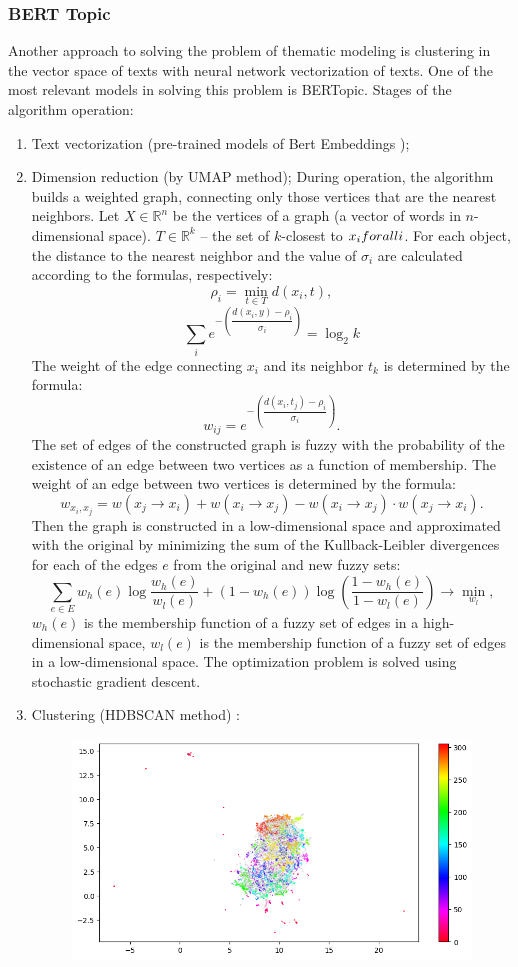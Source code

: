\documentclass[12pt]{report}
\begin{document}
\subsubsection{BERT Topic}
Another approach to solving the problem of thematic modeling is clustering in the vector space of texts with neural network vectorization of texts. One of the most relevant models in solving this problem is BERTopic. Stages of the algorithm operation:
\begin{enumerate}
\item Text vectorization (pre-trained models of Bert Embeddings );
\item Dimension reduction (by UMAP method);
During operation, the algorithm builds a weighted graph, connecting only those vertices that are the nearest neighbors. Let $X\in\mathbb{R}^n$ be the vertices of a graph (a vector of words in $n$-dimensional space). $T\in\mathbb{R}^{k}$ -- the set of $k$-closest to $x_i\\forall i$. For each object, the distance to the nearest neighbor and the value of $\sigma_i$ are calculated according to the formulas, respectively:
\[\rho_i = \min\limits_{t\in T} d(x_i, t),\]
\[\sum\limits_{i}e^{-\left(\dfrac{d(x_i,y) - \rho_i}{\sigma_i}\right)} = \log_2 k\]
The weight of the edge connecting $x_i$ and its neighbor $t_k$ is determined by the formula:
\[w_{ij} = e^{-\left(\dfrac{d(x_i, t_j) -\rho_i}{\sigma_i}\right)}.\]
The set of edges of the constructed graph is fuzzy with the probability of the existence of an edge between two vertices as a function of membership. The weight of an edge between two vertices is determined by the formula:
\[w_{x_i, x_j} = w(x_j \to x_i) + w(x_i \to x_j) - w(x_i \to x_j) \cdot w(x_j\to x_i).\]
Then the graph is constructed in a low-dimensional space and approximated with the original by minimizing the sum of the Kullback-Leibler divergences for each of the edges $e$ from the original and new fuzzy sets:
\[\sum\limits_{e\in E} w_h(e)\log\dfrac{w_h(e)}{w_l(e)} + (1-w_h(e))\log\left(\dfrac{1-w_h(e)}{1-w_l(e)}\right) \to \min\limits_{w_l},\]
$w_h(e)$ is the membership function of a fuzzy set of edges in a high-dimensional space, $w_l(e)$ is the membership function of a fuzzy set of edges in a low-dimensional space. The optimization problem is solved using stochastic gradient descent.
\item Clustering (HDBSCAN method) :
\begin{figure}
\centering
\includegraphics[scale=0.75]{hdbscan.png}

\end{figure}
\end{enumerate}
\end{document}
